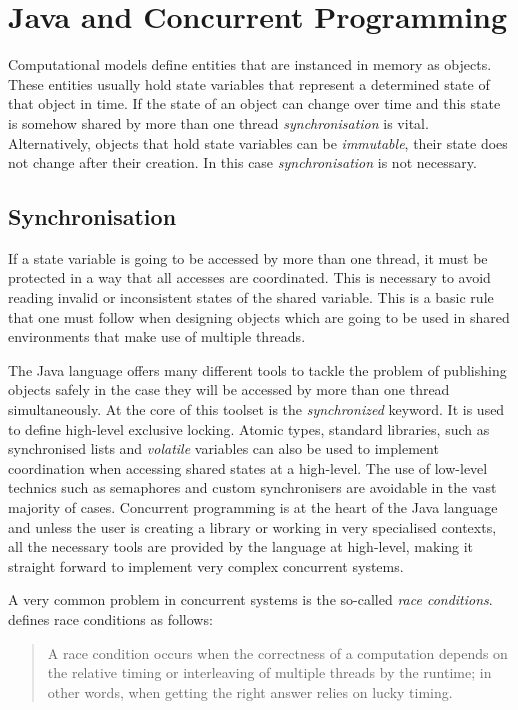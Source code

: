 \section{Java and Concurrent Programming}

Computational models define entities that are instanced in memory as objects. These entities usually hold state variables that represent a determined state of that object in time. If the state of an object can change over time and this state is somehow shared by more than one thread \emph{synchronisation} is vital. Alternatively, objects that hold state variables can be \emph{immutable}, their state does not change after their creation. In this case \emph{synchronisation} is not necessary.

\subsection{Synchronisation}

If a state variable is going to be accessed by more than one thread, it must be protected in a way that all accesses are coordinated. This is necessary to avoid reading invalid or inconsistent states of the shared variable. This is a basic rule that one must follow when designing objects which are going to be used in shared environments that make use of multiple threads.

The Java language offers many different tools to tackle the problem of publishing objects safely in the case they will be accessed by more than one thread simultaneously. At the core of this toolset is the \emph{synchronized} keyword. It is used to define high-level exclusive locking. Atomic types, standard libraries, such as synchronised lists and \emph{volatile} variables can also be used to implement coordination when accessing shared states at a high-level. The use of low-level technics such as semaphores and custom synchronisers are avoidable in the vast majority of cases. Concurrent programming is at the heart of the Java language and unless the user is creating a library or working in very specialised contexts, all the necessary tools are provided by the language at high-level, making it straight forward to implement very complex concurrent systems.

A very common problem in concurrent systems is the so-called \emph{race conditions}. \citeauthor{goetz2006java} defines race conditions as follows:

\begin{quote}
   A race condition occurs when the correctness of a computation depends on the relative timing or interleaving of multiple threads by the runtime; in other words, when getting the right answer relies on lucky timing.
\end{quote}

